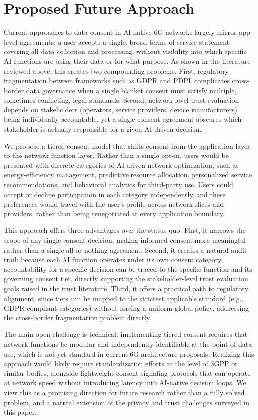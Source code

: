 \section{Proposed Future Approach}

Current approaches to data consent in AI-native 6G networks largely mirror app-level
agreements: a user accepts a single, broad terms-of-service statement covering all data
collection and processing, without visibility into which specific AI functions are using
their data or for what purpose. As shown in the literature reviewed above, this creates
two compounding problems. First, regulatory fragmentation between frameworks such as
GDPR and PDPL complicates cross-border data governance when a single blanket consent
must satisfy multiple, sometimes conflicting, legal standards. Second, network-level
trust evaluation depends on stakeholders (operators, service providers, device
manufacturers) being individually accountable, yet a single consent agreement obscures
which stakeholder is actually responsible for a given AI-driven decision.

We propose a tiered consent model that shifts consent from the application layer to the
network function layer. Rather than a single opt-in, users would be presented with
discrete categories of AI-driven network optimization, such as energy-efficiency
management, predictive resource allocation, personalized service recommendations, and
behavioral analytics for third-party use. Users could accept or decline participation in
each category independently, and these preferences would travel with the user's profile
across network slices and providers, rather than being renegotiated at every application
boundary.

This approach offers three advantages over the status quo. First, it narrows the scope
of any single consent decision, making informed consent more meaningful rather than a
single all-or-nothing agreement. Second, it creates a natural audit trail: because each
AI function operates under its own consent category, accountability for a specific
decision can be traced to the specific function and its governing consent tier, directly
supporting the stakeholder-level trust evaluation goals raised in the trust literature.
Third, it offers a practical path to regulatory alignment, since tiers can be mapped to
the strictest applicable standard (e.g., GDPR-compliant categories) without forcing a
uniform global policy, addressing the cross-border fragmentation problem directly.

The main open challenge is technical: implementing tiered consent requires that network
functions be modular and independently identifiable at the point of data use, which is
not yet standard in current 6G architecture proposals. Realizing this approach would
likely require standardization efforts at the level of 3GPP or similar bodies, alongside
lightweight consent-signaling protocols that can operate at network speed without
introducing latency into AI-native decision loops. We view this as a promising direction
for future research rather than a fully solved problem, and a natural extension of the
privacy and trust challenges surveyed in this paper.

